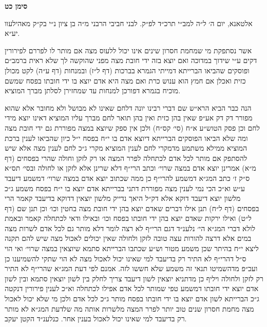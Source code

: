 \documentclass[12pt, openany]{book}
\newcommand{\chapname}{}
\newcommand{\newchap}[1]{
	\addcontentsline{toc}{chapter}{#1}
	\renewcommand{\chapname}{#1}
		\begin{center}
			\textbf{%
\fontsize{16pt}{16pt}\selectfont
				#1}
		\end{center}
}
\begin{document}
\newchap{סימן כט}
\begin{multicols}{2}
אלטאנא, יום ה׳ ל״ה למב״י תרכ״ד לפ״ק. לבני חביבי הרבני מ״ה בן ציון נ״י בק״ק מאהילעוו יע״א.\\\vspace{0pt}

אשר נסתפקת מי שמחמת חסרון שינים אינו יכול ללעוס מצה אם מותר לו לפררם לפירורין דקים ע״י שידוך במדוכה ואם יוצא בזה ידי חובת מצה מפני שהוקשה לך שלא ראית ברמב״ם ופוסקים שהביאו הברייתא דמייתי הגמרא בברכות (דף ל״ז) ובמנחות (דף ע״ה) לקט מכולן כזית ואכלן אם חמץ הוא ענוש כרת ואם מצה היא אדם יוצא בו ידי חובתו בפסח שמשם מוכיח בגמרא דפורכן למנחות עד שמחזירן לסלתן מברך המוציא.\\\vspace{0pt}

הנה כבר הביא הרא״ש שם דברי רבינו יונה דלחם שאינו לא מבושל ולא מחובר אלא שהוא מפורר דק דק אע״פ שאין בהן כזית ואין בהן תואר לחם מברך עליו המוציא דאינו יוצא מידי לחם וכן פסק הטוש״ע א״ח (סי׳ קס״ח) ולכן אין ספק שיוצא במצה מפוררת גם ידי חובת מצה ומה שלא הביאו הפוסקים הברייתא דיוצא אדם בו י״ח בפסח י״ל כיון שהביאו לענין ברכת המוציא ממילא משתמע מדמקרי לחם לענין המוציא מקרי ג״כ לחם לענין מצה אלא שיש להסתפק אם מותר לכל אדם לכתחלה לפרר המצה או רק לזקן וחולה שהרי בפסחים (דף מ״א) אמרינן יוצא אדם במצה שרוי׳ וכתב הרי״ף דלא שרינן אלא לזקן או לחולה ובסי׳ תס״א ס״ק ז׳ כתב המג״א דמשמע להרי״ף כן ממה שכתוב יוצא אדם במצה שרוי׳ דמשמע דיעבד ע״ש וא״כ הכי נמי לענין מצה מפוררת דתני בברייתא אדם יוצא בו י״ח בפסח משמע ג״כ מלשון יוצא דיעבד דוקא אלא דק״ל היאך נדייק מלשון יוצאין דדוקא בדיעבד קאמר הרי בפסחים (דף ל״ח) תנן אילו דברים שאדם יוצא בהן ידי חובת מצה בחטין וכו׳ וכן תנן שם (דף ל״ט) ואילו ירקות שאדם יוצא בהן ידי חובתו בפסח וכו׳ ובאילו ודאי לכתחלה קאמר ובאמת לולא דברי המג״א הי׳ נלענ״ד דגם הרי״ף לא רצה לומר דלא מותר גם לכל אדם לשרות מצה במים אלא דרצה להורות עצה טובה לזקן ולחולה שאין יכולים לאכול מצה שיש להם תקנה ליצא י״ח בהיתר שכן משמע מטור וש״ע שכתבו הברייתא סתמא שיוצאין במצה שרוי׳ ואי הוי ס״ל דהרי״ף לא התיר רק בדיעבד למי שאינו יכול לאכול מצה לא הוי שתקי להשמיענו כן ועכ״פ מדהשמיטו תנאי זה משמע שלא חששו לזה. אמנם לפי דעת המג״א שהרי״ף לא התיר רק לזקן ולחולה ויליף כן מדתניא יוצאין לשון דיעבד צריך לחלק בין לשון יוצאין סתמא ובין לשון אדם יוצא ידי חובתו דמשמע טפי שמותר לכל אדם אפילו לכתחלה וא״כ לענין פירורין דנקטה ג״כ הברייתא לשון אדם יוצא בו ידי חובתו בפסח מותר ג״כ לכל אדם ולכן מי שלא יכול לאכול מצה מחמת חסרון שנים טוב יותר לפרר המצה מלשרות אותה מה שלדעת המג״א לא מותר רק בדיעבד למי שאינו יכול לאכול בענין אחר. כנלענ״ד הקטן יעקב.\\\vspace{0pt}

\end{multicols}\newpage
\end{document}
